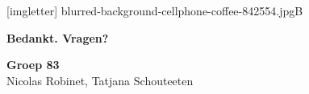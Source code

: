 \documentclass[aspectratio=169]{beamer}
\begin{document}

{
[imgletter]
    {blurred-background-cellphone-coffee-842554.jpg}{B}

\begin{frame}

    {\huge \textbf{Bedankt. Vragen?}}

    \bigskip

    \textbf{Groep 83} \\
    Nicolas Robinet, Tatjana Schouteeten

\end{frame}
}
\end{document}
